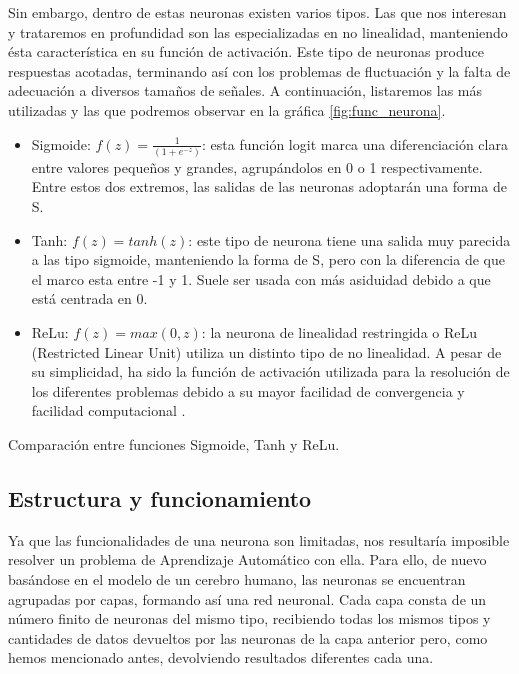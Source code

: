 Sin embargo, dentro de estas neuronas existen varios tipos. Las que nos interesan y trataremos en profundidad son las especializadas en no linealidad, manteniendo ésta característica en su función de activación. Este tipo de neuronas produce respuestas acotadas, terminando así con los problemas de fluctuación y la falta de adecuación a diversos tamaños de señales. A continuación, listaremos las más utilizadas y las que podremos observar en la gráfica \ref{fig:func_neurona}.

\begin{itemize}
    \item Sigmoide: $f(z) = \frac{1}{(1+e^{-z})}$: esta función logit marca una diferenciación clara entre valores pequeños y grandes, agrupándolos en 0 o 1 respectivamente. Entre estos dos extremos, las salidas de las neuronas adoptarán una forma de S.
    \item Tanh: $f(z)= tanh(z)$: este tipo de neurona tiene una salida muy parecida a las tipo sigmoide, manteniendo la forma de S, pero con la diferencia de que el marco esta entre -1 y 1. Suele ser usada con más asiduidad debido a que está centrada en 0.
    \item ReLu: $f(z) = max(0,z)$: la neurona de linealidad restringida o ReLu (Restricted Linear Unit) utiliza un distinto tipo de no linealidad. A pesar de su simplicidad, ha sido la función de activación utilizada para la resolución de los diferentes problemas debido a su mayor facilidad de convergencia y facilidad computacional \citep{Enyinna2018}.
\end{itemize}

%
       {Comparación entre funciones Sigmoide, Tanh y ReLu.}

\subsection{Estructura y funcionamiento}
Ya que las funcionalidades de una neurona son limitadas, nos resultaría imposible resolver un problema de Aprendizaje Automático con ella. Para ello, de nuevo basándose en el modelo de un cerebro humano, las neuronas se encuentran agrupadas por capas, formando así una red neuronal. Cada capa consta de un número finito de neuronas del mismo tipo, recibiendo todas los mismos tipos y cantidades de datos devueltos por las neuronas de la capa anterior pero, como hemos mencionado antes, devolviendo resultados diferentes cada una.

